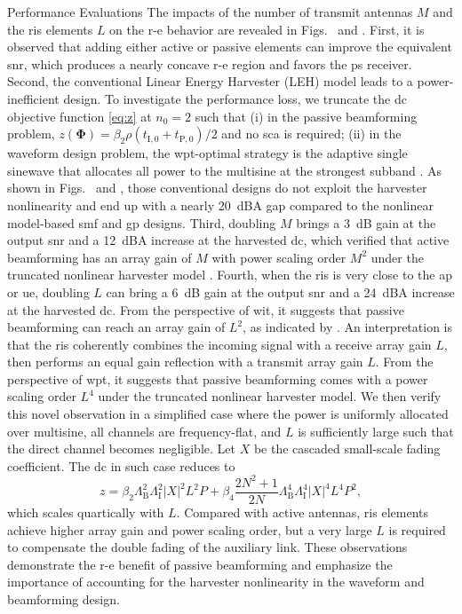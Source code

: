 \begin{section}{Performance Evaluations}
	The impacts of the number of transmit antennas $M$ and the \gls{ris} elements $L$ on the \gls{r-e} behavior are revealed in Figs.~ and . First, it is observed that adding either active or passive elements can improve the equivalent \gls{snr}, which produces a nearly concave \gls{r-e} region and favors the \gls{ps} receiver. Second, the conventional Linear Energy Harvester (LEH) model leads to a power-inefficient design. To investigate the performance loss, we truncate the \gls{dc} objective function \eqref{eq:z} at $n_0=2$ such that (i) in the passive beamforming problem, $z(\mathbf{\Phi}) = {\beta_2}{\rho}(t_{\mathrm{I},0}+t_{\mathrm{P},0})/2$ and no \gls{sca} is required; (ii) in the waveform design problem, the \gls{wpt}-optimal strategy is the adaptive single sinewave that allocates all power to the multisine at the strongest subband \cite{Clerckx2016a}. As shown in Figs.~ and , those conventional designs do not exploit the harvester nonlinearity and end up with a nearly \qty{20}{dBA} gap compared to the nonlinear model-based \gls{smf} and \gls{gp} designs. Third, doubling $M$ brings a \qty{3}{\dB} gain at the output \gls{snr} and a \qty{12}{dBA} increase at the harvested \gls{dc}, which verified that active beamforming has an array gain of $M$ \cite{Tse2005} with power scaling order $M^2$ under the truncated nonlinear harvester model \cite{Clerckx2016a,Clerckx2018b}. Fourth, when the \gls{ris} is very close to the \gls{ap} or \gls{ue}, doubling $L$ can bring a \qty{6}{\dB} gain at the output \gls{snr} and a \qty{24}{dBA} increase at the harvested \gls{dc}. From the perspective of \gls{wit}, it suggests that passive beamforming can reach an array gain of $L^2$, as indicated by \cite{Wu2019}. An interpretation is that the \gls{ris} coherently combines the incoming signal with a receive array gain $L$, then performs an equal gain reflection with a transmit array gain $L$. From the perspective of \gls{wpt}, it suggests that passive beamforming comes with a power scaling order $L^4$ under the truncated nonlinear harvester model. We then verify this novel observation in a simplified case where the power is uniformly allocated over multisine, all channels are frequency-flat, and $L$ is sufficiently large such that the direct channel becomes negligible. Let $X$ be the cascaded small-scale fading coefficient. The \gls{dc} in such case reduces to
	\begin{equation}
		z = \beta_2 \Lambda_{\mathrm{B}}^2 \Lambda_{\mathrm{I}}^2 \lvert X \rvert^2 L^2 P + \beta_4 \frac{2N^2 + 1}{2N} \Lambda_{\mathrm{B}}^4 \Lambda_{\mathrm{I}}^4 \lvert X \rvert^4 L^4 P^2,
	\end{equation}
	which scales quartically with $L$. Compared with active antennas, \gls{ris} elements achieve higher array gain and power scaling order, but a very large $L$ is required to compensate the double fading of the auxiliary link. These observations demonstrate the \gls{r-e} benefit of passive beamforming and emphasize the importance of accounting for the harvester nonlinearity in the waveform and beamforming design.


\end{section}
